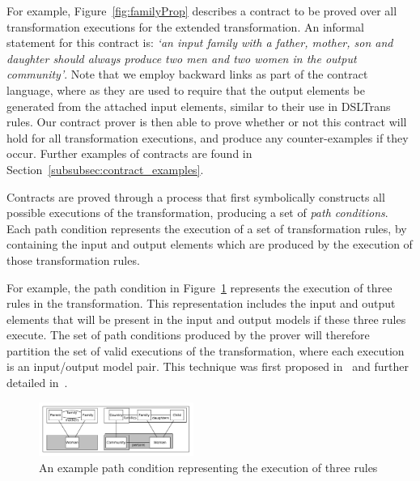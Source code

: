   For example, Figure~\ref{fig:familyProp} describes a contract to be proved over all transformation executions for the extended \FTP transformation. An informal statement for this contract is:
  \textit{`an input family with a father, mother, son and daughter should always produce
  two men and two women in the output community'}. Note that we employ backward links as part of the contract language, where as they are used to require that the output elements be
  generated from the attached input elements, similar to their use in DSLTrans rules. Our contract prover is then
  able to prove whether or not this contract will hold for all transformation executions, and produce any counter-examples if they occur. Further examples of contracts are found in Section~\ref{subsubsec:contract_examples}.


 Contracts are proved through a process that first symbolically constructs all
 possible executions of the transformation, producing a set of \emph{path conditions}. Each path condition represents the execution of a set of transformation rules, by containing the input and output elements which are produced by the execution of those transformation rules.

 For example, the path condition in Figure~\ref{fig:pc_first} represents the execution of three rules in the transformation. This representation includes the input and output elements that will be present in the input and output models if these three rules execute. The set of path conditions produced by the prover will therefore partition the set of valid executions of the transformation, where each execution is an input/output model pair. This technique was first proposed in~\cite{Lucio2010} and further detailed in~\cite{Lucio2014}.

   \begin{figure}[t]
     \begin{center}
       \includegraphics[width=0.45\textwidth]{figures/prover/pc}
       \caption{An example path condition representing the execution of three rules}
       \label{fig:pc_first}
     \end{center}
     \vspace{-0.20in}
   \end{figure}




